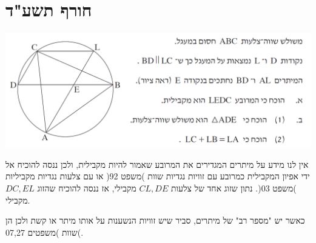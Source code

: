 \documentclass[12pt,a4paper]{article}
\begin{document}


\section*{חורף תשע"ד}

\begin{center}
\includegraphics[width=\textwidth]{winter-2014-4}
\end{center}

\textbf{}
אין לנו מידע על מיתרים המגדירים את המרובע שאמור להיות מקבילית, ולכן ננסה להוכיח אל ידי אפיון המקבילית כמרובע עם זוויות נגדיות שוות )משפט 92( או עם צלעות נגדיות מקביליות )משפט 03(. נתון שזוג אחד של צלעות
$CL,DE$
מקבילי, אז ננסה להוכיח שהזוג
$DC,EL$
מקבילי.

כאשר יש "מספר רב" של מיתרים, סביר שיש זוויות הנשענות על אותו מיתר או קשת ולכן הן שוות )משפטים 07,27(.
\end{document}
